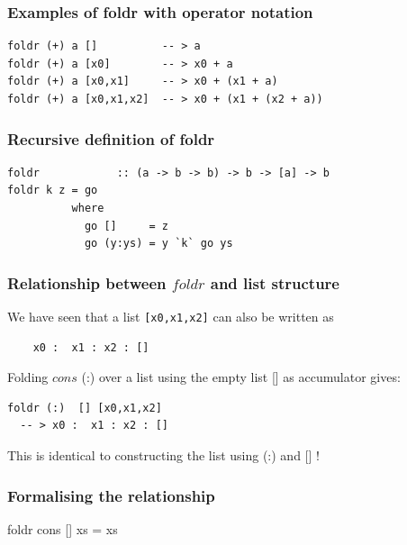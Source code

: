 \documentclass{beamer}
\begin{document}
\begin{frame}[fragile]
\frametitle{Examples of foldr with operator notation}

\begin{verbatim}
foldr (+) a []          -- > a
foldr (+) a [x0]        -- > x0 + a
foldr (+) a [x0,x1]     -- > x0 + (x1 + a)
foldr (+) a [x0,x1,x2]  -- > x0 + (x1 + (x2 + a))
\end{verbatim}

\end{frame}

\begin{frame}[fragile]
\frametitle{Recursive definition of foldr}

\begin{verbatim}
foldr            :: (a -> b -> b) -> b -> [a] -> b
foldr k z = go
          where
            go []     = z
            go (y:ys) = y `k` go ys
\end{verbatim}

\end{frame}

\begin{frame}[fragile]
\frametitle{Relationship between $foldr$ and list structure}
We have seen that a list \texttt{[x0,x1,x2]} can also be written as

\begin{verbatim}
	x0 :  x1 : x2 : []
\end{verbatim}

Folding $cons$ (:) over a list using the empty list [] as accumulator gives:

\begin{verbatim}
foldr (:)  [] [x0,x1,x2]
  -- > x0 :  x1 : x2 : []
\end{verbatim}

This is identical to constructing the list using (:) and [] !

\end{frame}


\begin{frame}[fragile]
\frametitle{Formalising the relationship}

\begin{theorem}
foldr cons [] xs = xs
\end{theorem}

\end{frame}
\end{document}
